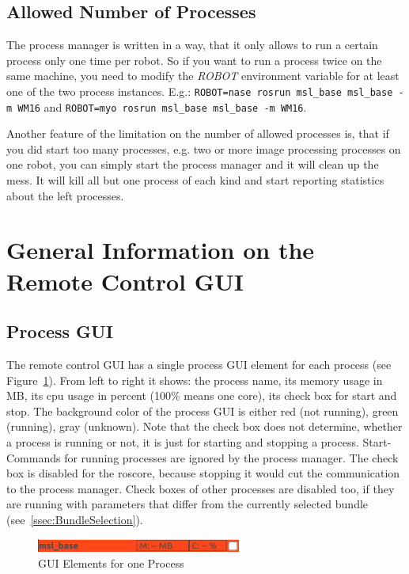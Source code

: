 \subsection*{Allowed Number of Processes}

The process manager is written in a way, that it only allows to run a certain process only one time per robot. So if you want to run a process twice on the same machine, you need to modify the \emph{ROBOT} environment variable for at least one of the two process instances. E.g.: \verb#ROBOT=nase rosrun msl_base msl_base -m WM16# and \verb#ROBOT=myo rosrun msl_base msl_base -m WM16#. 

Another feature of the limitation on the number of allowed processes is, that if you did start too many processes, e.g. two or more image processing processes on one robot, you can simply start the process manager and it will clean up the mess. It will kill all but one process of each kind and start reporting statistics about the left processes.

\section{General Information on the Remote Control GUI}
\label{sec:GenRemoteControl GUI}

\subsection*{Process GUI}

The remote control GUI has a single process GUI element for each process (see Figure~\ref{fig:ProcManProcessGUI}). From left to right it shows: the process name, its memory usage in MB, its cpu usage in percent (100\% means one core), its check box for start and stop. The background color of the process GUI is either red (not running), green (running), gray (unknown). Note that the check box does not determine, whether a process is running or not, it is just for starting and stopping a process. Start-Commands for running processes are ignored by the process manager. The check box is disabled for the roscore, because stopping it would cut the communication to the process manager. Check boxes of other processes are disabled too, if they are running with parameters that differ from the currently selected bundle (see~\ref{ssec:BundleSelection}).

\begin{figure}[htbp]
 \centering
 \includegraphics[width=0.6\textwidth]{pic/ProcManProcessGUI.png}
 \caption{GUI Elements for one Process}
 \label{fig:ProcManProcessGUI}
\end{figure}

